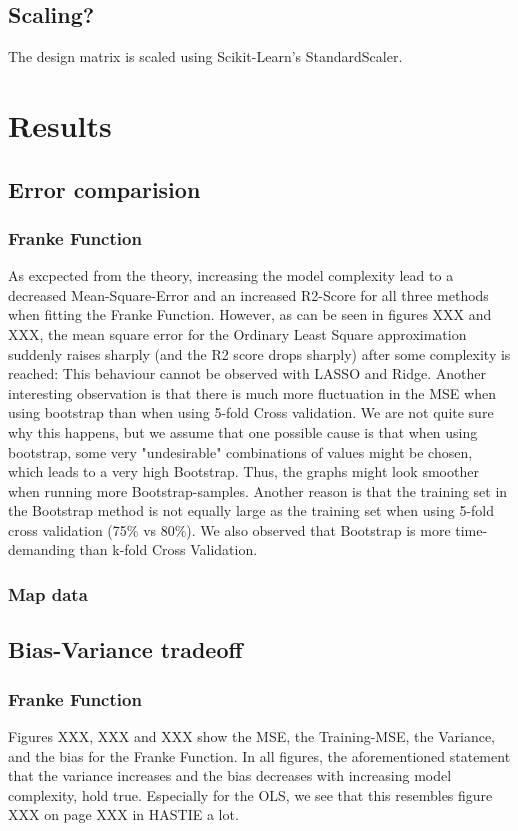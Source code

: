 \documentclass[11pt,a4paper]{article}
\begin{document}
\subsection{Scaling?}
The design matrix is scaled using Scikit-Learn's StandardScaler.
\section{Results}
\subsection{Error comparision}
\subsubsection{Franke Function}
As excpected from the theory, increasing the model complexity lead to a decreased Mean-Square-Error and an increased R2-Score for all three methods when fitting the Franke Function. However, as can be seen in figures XXX and XXX, the mean square error for the Ordinary Least Square approximation suddenly raises sharply (and the R2 score drops sharply) after some complexity is reached: This behaviour cannot be observed with LASSO and Ridge. Another interesting observation is that there is much more fluctuation in the MSE when using bootstrap than when using 5-fold Cross validation. We are not quite sure why this happens, but we assume that one possible cause is that when using bootstrap, some very "undesirable" combinations of values might be chosen, which leads to a very high Bootstrap. Thus, the graphs might look smoother when running more Bootstrap-samples. Another reason is that the training set in the Bootstrap method is not equally large as the training set when using 5-fold cross validation (75\% vs 80\%). We also observed that Bootstrap is more time-demanding than k-fold Cross Validation.
\subsubsection{Map data}
\subsection{Bias-Variance tradeoff}

\subsubsection{Franke Function}
Figures XXX, XXX and XXX show the MSE, the Training-MSE, the Variance, and the bias for the Franke Function. In all figures, the aforementioned statement that the variance increases and the bias decreases with increasing model complexity, hold true. Especially for the OLS, we see that this resembles  figure XXX on page XXX in HASTIE a lot. 
\end{document}
